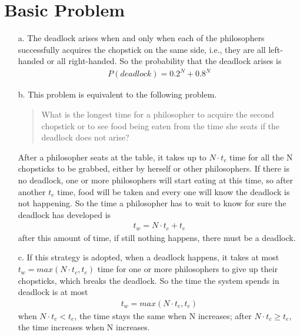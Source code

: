 \documentclass[12pt,letterpaper]{article}
\begin{document}
\section*{Basic Problem}
\begin{itemize}
\item[a.] The deadlock arises when and only when each of the philosophers successfully acquires the chopstick on the same side, i.e., they are all left-handed or all right-handed. So the probability that the deadlock arises is
\begin{align}
P(deadlock) = 0.2^N + 0.8^N
\end{align}
\item[b.] This problem is equivalent to the following problem.
\begin{quote}
What is the longest time for a philosopher to acquire the second chopstick or to see food being eaten from the time she seats if the deadlock does not arise?
\end{quote}
After a philosopher seats at the table, it takes up to $N\cdot t_c$ time for all the N chopsticks to be grabbed, either by herself or other philosophers. If there is no deadlock, one or more philosophers will start eating at this time, so after another $t_e$ time, food will be taken and every one will know the deadlock is not happening. So the time a philosopher has to wait to know for sure the deadlock has developed is
\begin{align}
t_w = N\cdot t_c+t_e
\end{align}
after this amount of time, if still nothing happens, there must be a deadlock.
\item[c.] If this strategy is adopted, when a deadlock happens, it takes at most $t_w = max(N\cdot t_c,t_e)$ time for one or more philosophers to give up their chopsticks, which breaks the deadlock. So the time the system spends in deadlock is at most
\begin{align}
t_w = max(N\cdot t_c,t_e)
\end{align}
when $N\cdot t_c<t_e$, the time stays the same when N increases; after $N\cdot t_c\ge t_e$, the time increases when N increases.
\end{itemize}
\end{document}
